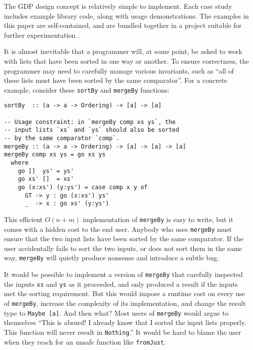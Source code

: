 \documentclass[format=sigplan, review=false, screen=true, 10pt]{acmart}
\makeatletter
\let\origsection\section
\renewcommand\section{\@ifstar{\starsection}{\nostarsection}}
\newcommand\nostarsection[1]
{\sectionprelude\origsection{#1}\sectionpostlude}
\newcommand\starsection[1]
{\sectionprelude\origsection*{#1}\sectionpostlude}
\newcommand\sectionprelude{%
  \vspace{-0.5em}
}
\newcommand\sectionpostlude{%
  \vspace{0em}
}
\makeatother
\begin{document}
The GDP design concept is relatively simple to implement. Each case study includes example library code,
along with usage demonstrations. The examples in this paper are self-contained, and are bundled together in
a project suitable for further experimentation \cite{this}. 


\section{Case Study \#1: Sorted lists}

It is almost inevitable that a programmer will, at some point, be asked to work
with lists that have been sorted in one way or another. To ensure correctness,
the programmer may need to carefully manage various invariants, such
as ``all of these lists must have been sorted by the same comparator''. For a concrete
example, consider these \texttt{sortBy} and \texttt{mergeBy} functions:
\begin{verbatim}
sortBy  :: (a -> a -> Ordering) -> [a] -> [a]

-- Usage constraint: in `mergeBy comp xs ys`, the
-- input lists `xs` and `ys` should also be sorted
-- by the same comparator `comp`.
mergeBy :: (a -> a -> Ordering) -> [a] -> [a] -> [a]
mergeBy comp xs ys = go xs ys
  where
    go []  ys' = ys'
    go xs' []  = xs'
    go (x:xs') (y:ys') = case comp x y of
      GT -> y : go (x:xs') ys'
      _  -> x : go xs' (y:ys')
\end{verbatim}
This efficient $O(n+m)$ implementation of \texttt{mergeBy} is easy to write,
but it comes with a hidden cost to the end user. Anybody who uses \texttt{mergeBy}
must ensure that the two input lists have been sorted by the same comparator.
If the user accidentally fails to sort the two inputs, or does not sort them in the same way,
\texttt{mergeBy} will quietly produce nonsense and introduce a subtle bug.

It would be possible to implement a version of \texttt{mergeBy} that
carefully inspected the inputs \texttt{xs} and \texttt{ys} as it
proceeded, and only produced a result if the inputs met the sorting
requirement. But this would impose a runtime cost on every use of
\texttt{mergeBy}, increase the complexity of its implementation,
and change the result type to \texttt{Maybe [a]}. And then what?
Most users of \texttt{mergeBy} would argue to themselves ``This is
absurd! I already know that I sorted the input lists properly. This
function will never result in \texttt{Nothing}.'' It would be hard
to blame the user when they reach for an  unsafe function like
\texttt{fromJust}.
\end{document}
